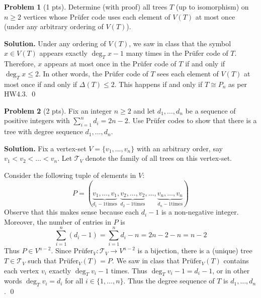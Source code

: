 \documentclass[11pt]{scrartcl}
\theoremstyle{definition}
\newtheorem{problem}{Problem}
\newenvironment{solution}{\noindent\textbf{Solution.}}{\qed}
\begin{document}
\hrulefill

\begin{problem}[1 pts]
	Determine (with proof) all trees $T$ (up to isomorphism) on $n\geq 2$ vertices whose Pr\"ufer code uses each element of $V(T)$ at most once (under any arbitrary ordering of $V(T)$).
\end{problem}

\begin{solution}
Under any ordering of $V(T)$, we saw in class that the symbol $x\in V(T)$ appears exactly $\deg_Tx -1$ many times in the Pr\"ufer code of $T$. Therefore, $x$ appears at most once in the Pr\"ufer code of $T$ if and only if $\deg_T x \leq 2$. In other words, the Pr\"ufer code of $T$ sees each element of $V(T)$ at most once if and only if $\Delta(T)\leq 2$. This happens if and only if $T\cong P_n$ as per HW4.3.
\end{solution}

\hrulefill

\begin{problem}[2 pts]
	Fix an integer $n\geq 2$ and let $d_1,\dots,d_n$ be a sequence of positive integers with $\sum_{i=1}^nd_i=2n-2$.
	Use Pr\"ufer codes to show that there is a tree with degree sequence $d_1,\dots,d_n$.
\end{problem}

\begin{solution}
Fix a vertex-set $V=\{v_1, \dots, v_n\}$ with an arbitrary order, say $v_1<v_2<\dots<v_n$. Let $\mathcal T_V$ denote the family of all trees on this vertex-set. 

Consider the following tuple of elements in $V$:
\[P=( \underbrace{v_1, \dots, v_1}_{d_1 -1 \text{times}}, \underbrace{v_2, \dots, v_2}_{d_2 -1 \text{times}}, \dots,  \underbrace{v_n, \dots, v_n}_{d_n -1 \text{times}})\]
Observe that this makes sense because each $d_i-1$ is a non-negative integer. Moreover, the number of entries in $P$ is 
\[ \sum_{i=1}^{n}(d_i -1 ) = \sum_{i=1}^{n}d_i  - n = 2n-2- n= n-2 \]
Thus $P \in V^{n-2}$. Since $\textrm{Pr\"ufer}_V \colon \mathcal T_V \to V^{n-2}$ is a bijection, there is a (unique) tree $T\in \mathcal T_V$ such that $\textrm{Pr\"ufer}_V (T)=P$. We saw in class that $\textrm{Pr\"ufer}_V (T)$ contains each vertex $v_i$ exactly $\deg_T v_i -1$ times. Thus $\deg_T v_i -1= d_i-1$, or in other words $\deg_T v_i = d_i$ for all $i\in \{1,\dots, n\}$. Thus the degree sequence of $T$ is $d_1,\dots,d_n$.
\end{solution}

\hrulefill
\end{document}
